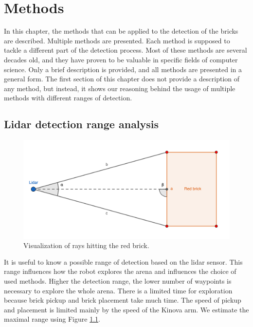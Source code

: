 \chapter{Methods}
\label{ch:methods}
In this chapter, the methods that can be applied to the detection of the bricks are described. Multiple methods are presented. Each method is supposed to tackle a different part of the detection process. Most of these methods are several decades old, and they have proven to be valuable in specific fields of computer science. Only a brief description is provided, and all methods are presented in a general form. The first section of this chapter does not provide a description of any method, but instead, it shows our reasoning behind the usage of multiple methods with different ranges of detection.
 
\section{Lidar detection range analysis}

\begin{figure}[H]
	\centering
	\includegraphics[scale=1.25]{fig/lidar_range.png}
	\caption[Lidar range study]{Visualization of rays hitting the red brick.}
	\label{fig:range}
\end{figure}

It is useful to know a possible range of detection based on the lidar sensor. This range influences how the robot explores the arena and influences the choice of used methods. Higher the detection range, the lower number of waypoints is necessary to explore the whole arena. There is a limited time for exploration because brick pickup and brick placement take much time. The speed of pickup and placement is limited mainly by the speed of the Kinova arm. We estimate the maximal range using Figure \ref{fig:range}.


